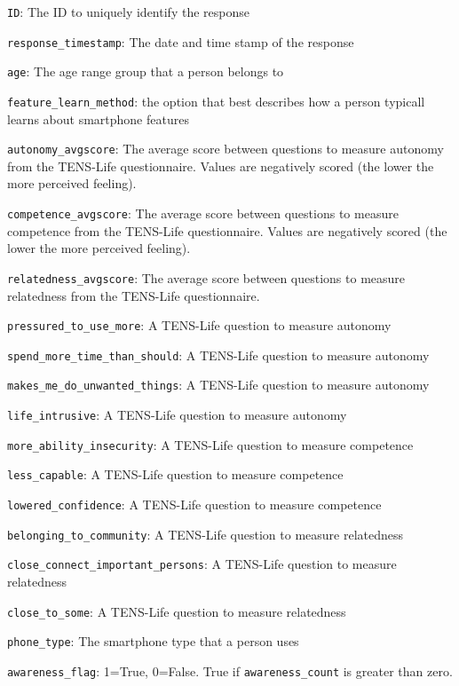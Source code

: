 \item \texttt{ID}: The ID to uniquely identify the response
\item \texttt{response\_timestamp}: The date and time stamp of the response
\item \texttt{age}: The age range group that a person belongs to 
\item \texttt{feature\_learn\_method}: the option that best describes how a person typicall learns about smartphone features
\item \texttt{autonomy\_avgscore}: The average score between questions to measure autonomy from the TENS-Life questionnaire. Values are negatively scored (the lower the more perceived feeling).
\item \texttt{competence\_avgscore}: The average score between questions to measure competence from the TENS-Life questionnaire. Values are negatively scored (the lower the more perceived feeling).
\item \texttt{relatedness\_avgscore}: The average score between questions to measure relatedness from the TENS-Life questionnaire.
\item \texttt{pressured\_to\_use\_more}: A TENS-Life question to measure autonomy
\item \texttt{spend\_more\_time\_than\_should}: A TENS-Life question to measure autonomy
\item \texttt{makes\_me\_do\_unwanted\_things}: A TENS-Life question to measure autonomy
\item \texttt{life\_intrusive}: A TENS-Life question to measure autonomy
\item \texttt{more\_ability\_insecurity}: A TENS-Life question to measure competence
\item \texttt{less\_capable}: A TENS-Life question to measure competence
\item \texttt{lowered\_confidence}: A TENS-Life question to measure competence
\item \texttt{belonging\_to\_community}: A TENS-Life question to measure relatedness
\item \texttt{close\_connect\_important\_persons}: A TENS-Life question to measure relatedness
\item \texttt{close\_to\_some}: A TENS-Life question to measure relatedness
\item \texttt{phone\_type}: The smartphone type that a person uses
\item \texttt{awareness\_flag}: 1=True, 0=False. True if \texttt{awareness\_count} is greater than zero.
